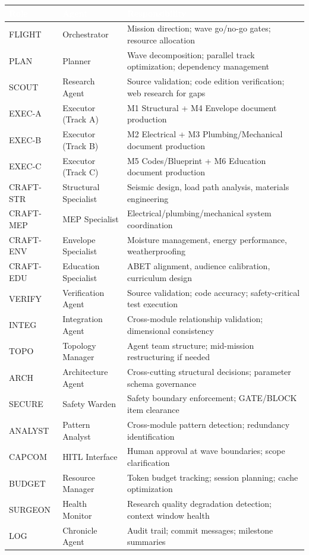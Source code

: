 \documentclass[11pt,letterpaper]{article}
\newcommand{\tableheader}[1]{\textbf{\sffamily\textcolor{white}{#1}}}
\begin{document}
\begin{center}
\begin{tabularx}{\textwidth}{C{1.5cm}L{2.5cm}X}
\toprule
{}
\tableheader{Role} & \tableheader{Agent} & \tableheader{Responsibility} \\
\midrule
FLIGHT & Orchestrator & Mission direction; wave go/no-go gates; resource allocation \\
PLAN & Planner & Wave decomposition; parallel track optimization; dependency management \\
SCOUT & Research Agent & Source validation; code edition verification; web research for gaps \\
EXEC-A & Executor (Track A) & M1 Structural + M4 Envelope document production \\
EXEC-B & Executor (Track B) & M2 Electrical + M3 Plumbing/Mechanical document production \\
EXEC-C & Executor (Track C) & M5 Codes/Blueprint + M6 Education document production \\
CRAFT-STR & Structural Specialist & Seismic design, load path analysis, materials engineering \\
CRAFT-MEP & MEP Specialist & Electrical/plumbing/mechanical system coordination \\
CRAFT-ENV & Envelope Specialist & Moisture management, energy performance, weatherproofing \\
CRAFT-EDU & Education Specialist & ABET alignment, audience calibration, curriculum design \\
VERIFY & Verification Agent & Source validation; code accuracy; safety-critical test execution \\
INTEG & Integration Agent & Cross-module relationship validation; dimensional consistency \\
TOPO & Topology Manager & Agent team structure; mid-mission restructuring if needed \\
ARCH & Architecture Agent & Cross-cutting structural decisions; parameter schema governance \\
SECURE & Safety Warden & Safety boundary enforcement; GATE/BLOCK item clearance \\
ANALYST & Pattern Analyst & Cross-module pattern detection; redundancy identification \\
CAPCOM & HITL Interface & Human approval at wave boundaries; scope clarification \\
BUDGET & Resource Manager & Token budget tracking; session planning; cache optimization \\
SURGEON & Health Monitor & Research quality degradation detection; context window health \\
LOG & Chronicle Agent & Audit trail; commit messages; milestone summaries \\
\bottomrule
\end{tabularx}
\end{center}
\end{document}
